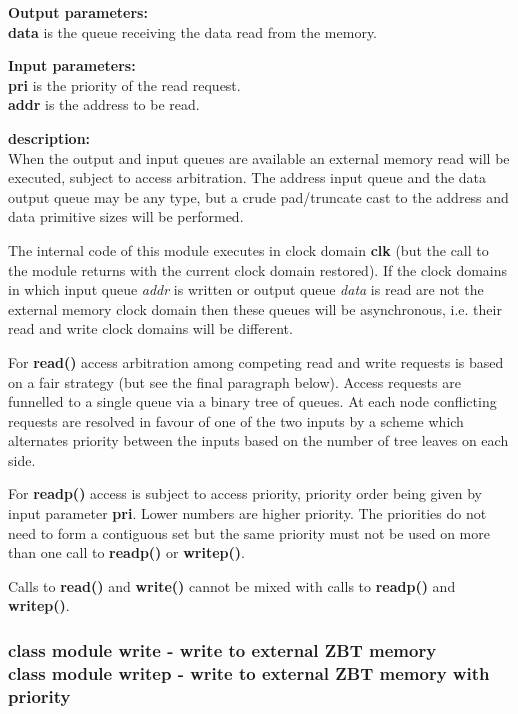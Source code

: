            {\bf Output parameters:} \\
            {\bf data} is the queue receiving the data read from the memory.

            {\bf Input parameters:} \\
            {\bf pri} is the priority of the read request. \\
            {\bf addr} is the address to be read.

            {\bf description:} \\
            When the output and input queues are available an external memory
            read will be executed, subject to access arbitration. The address
            input queue and the data output queue may be any type, but a
            crude pad/truncate cast to the address and data primitive sizes
            will be performed.
            
            The internal code of this module executes in clock domain {\bf clk}
            (but the call to the module returns with the current clock domain
            restored). If the clock domains in which input queue {\em addr} is
            written or output queue {\em data} is read are not the external memory
            clock domain then these queues will be asynchronous, i.e. their read
            and write clock domains will be different.
            
            For {\bf read()} access arbitration among competing read and
            write requests is based on a fair strategy (but see the final
            paragraph below). Access requests are funnelled to a single queue
            via a binary tree of queues. At each node conflicting requests
            are resolved in favour of one of the two inputs by a scheme which
            alternates priority between the inputs based on the number of
            tree leaves on each side.
            
            For {\bf readp()} access is subject to access priority, priority
            order being given by input parameter {\bf pri}. Lower numbers are
            higher priority. The priorities do not need to form a contiguous
            set but the same priority must not be used on more than one call
            to {\bf readp()} or {\bf writep()}.
            
            Calls to {\bf read()} and {\bf write()} cannot be mixed with calls
            to {\bf readp()} and {\bf writep()}.


        \subsubsection{class module write - write to external ZBT memory\\
                       class module writep - write to external ZBT memory with priority}\label{sec:lczbtramwrite}

